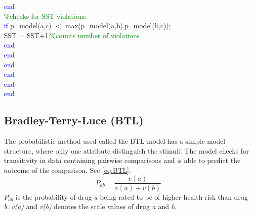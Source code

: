 {\hspace{1mm}\indent \indent \indent \indent \indent \indent \indent \textcolor{blue}{end} \\ 
\hspace{1mm}\indent \indent \indent \indent \indent\indent \indent \indent \textcolor{green}{\%checks for SST violations }\\ 
\hspace{1mm}\indent \indent \indent \indent \indent \indent \indent \indent \textcolor{blue}{if} p\_model(a,c) $<$ max(p\_model(a,b),p\_model(b,c)); \\ 
\hspace{1mm}\indent \indent \indent \indent \indent \indent \indent \indent \indent SST = SST+1;\textcolor{green}{\%counts number of violations }\\ 
\hspace{1mm}\indent \indent \indent \indent \indent \indent \indent \indent \textcolor{blue}{end} \\ 
\hspace{1mm}\indent \indent \indent \indent \indent \indent \indent \textcolor{blue}{end} \\ 
\hspace{1mm}\indent \indent \indent \indent \indent \indent \textcolor{blue}{end} \\ 
\hspace{1mm}\indent \indent \indent \indent \indent \textcolor{blue}{end} \\ 
\hspace{1mm}\indent \indent \indent \indent \textcolor{blue}{end} \\ 
\hspace{1mm}\indent \indent \indent \textcolor{blue}{end} \\ 
}

%
%
\subsection*{Bradley-Terry-Luce (BTL)}
The probabilistic method used called the BTL-model has a simple model structure, where only one attribute distinguish the stimuli. The model checks for transitivity in data containing pairwise comparisons and is able to predict the outcome of the comparison. See \autoref{eq:BTL}.
%
\begin{equation}
P_{ab} =\frac{v(a)}{v(a)+v(b)} 
\label{eq:BTL}
\end{equation}
%
$P_{ab}$ is the probability of drug \textit{a} being rated to be of higher health risk than drug \textit{b}. \textit{v(a)} and \textit{v(b)} denotes the scale values of drug \textit{a} and \textit{b}.

